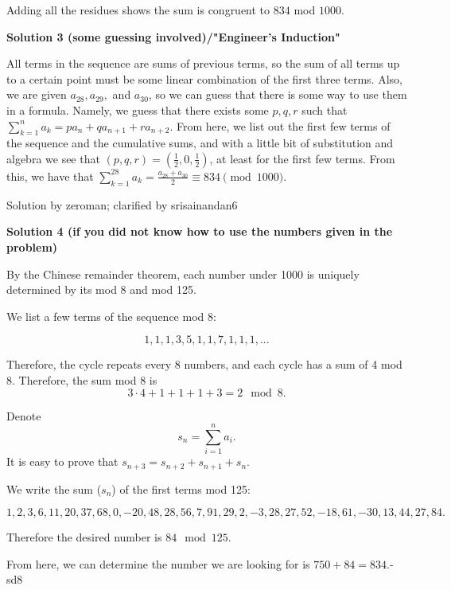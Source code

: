 \begin{enumerate}
 Adding all the residues shows the sum is congruent to $\boxed{834}$ mod $1000$.

 



\textbf{Solution 3 (some guessing involved)/"Engineer's Induction"}

All terms in the sequence are sums of previous terms, so the sum of all terms up to a certain point must be some linear combination of the first three terms. Also, we are given $a_{28}, a_{29},$ and $a_{30}$, so we can guess that there is some way to use them in a formula. Namely, we guess that there exists some $p, q, r$ such that $\sum_{k=1}^{n}{a_k} = pa_n+qa_{n+1}+ra_{n+2}$. From here, we list out the first few terms of the sequence and the cumulative sums, and with a little bit of substitution and algebra we see that $(p, q, r) = (\frac{1}{2}, 0, \frac{1}{2})$, at least for the first few terms. From this, we have that $\sum_{k=1}^{28}{a_k} = \frac{a_{28}+a_{30}}{2} \equiv{\boxed{834}}\pmod {1000}$.

 Solution by zeroman; clarified by srisainandan6

 


 



\textbf{Solution 4 (if you did not know how to use the numbers given in the problem)}

By the Chinese remainder theorem, each number under 1000 is uniquely determined by its mod 8 and mod 125.

 We list a few terms of the sequence mod 8:

 
 \[1,1,1,3,5,1,1,7,1,1,1,...\]

 Therefore, the cycle repeats every 8 numbers, and each cycle has a sum of 4 mod 8. Therefore, the sum mod 8 is 
 \[3 \cdot 4 + 1 + 1 + 1 + 3 = 2 \mod 8.\]

 Denote 
 \[s_n = \sum _{i=1} ^{n} a_i.\] It is easy to prove that $s_{n+3} = s_{n+2} + s_{n+1} + s_{n}.$

 We write the sum ($s_n$) of the first terms mod 125:

 
 \[1,2,3,6,11,20,37,68,0,-20,48,28,56,7,91,29,2,-3,28,27,52,-18,61,-30,13,44,27,84.\]

 Therefore the desired number is $84 \mod 125.$

 From here, we can determine the number we are looking for is $750 + 84 = \boxed{834}.$-sd8

 



\end{enumerate}
